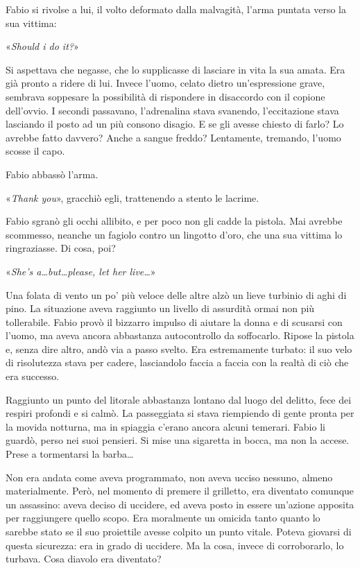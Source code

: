 Fabio si rivolse a lui, il volto deformato dalla malvagità, l'arma puntata verso la sua vittima:

«\textit{Should i do it?}»

Si aspettava che negasse, che lo supplicasse di lasciare in vita la sua amata. Era già pronto a ridere di lui. Invece l'uomo, celato dietro un'espressione grave, sembrava soppesare la possibilità di rispondere in disaccordo con il copione dell'ovvio. I secondi passavano, l'adrenalina stava svanendo, l'eccitazione stava lasciando il posto ad un più consono disagio. E se gli avesse chiesto di farlo? Lo avrebbe fatto davvero? Anche a sangue freddo? Lentamente, tremando, l'uomo scosse il capo.

Fabio abbassò l'arma.

«\textit{Thank you}», gracchiò egli, trattenendo a stento le lacrime.

Fabio sgranò gli occhi allibito, e per poco non gli cadde la pistola. Mai avrebbe scommesso, neanche un fagiolo contro un lingotto d'oro, che una sua vittima lo ringraziasse. Di cosa, poi?

«\textit{She's a\ldots but\ldots please, let her live\ldots}»

Una folata di vento un po' più veloce delle altre alzò un lieve turbinio di aghi di pino. La situazione aveva raggiunto un livello di assurdità ormai non più tollerabile. Fabio provò il bizzarro impulso di aiutare la donna e di scusarsi con l'uomo, ma aveva ancora abbastanza autocontrollo da soffocarlo. Ripose la pistola e, senza dire altro, andò via a passo svelto. Era estremamente turbato: il suo velo di risolutezza stava per cadere, lasciandolo faccia a faccia con la realtà di ciò che era successo.

Raggiunto un punto del litorale abbastanza lontano dal luogo del delitto, fece dei respiri profondi e si calmò. La passeggiata si stava riempiendo di gente pronta per la movida notturna, ma in spiaggia c'erano ancora alcuni temerari. Fabio li guardò, perso nei suoi pensieri. Si mise una sigaretta in bocca, ma non la accese. Prese a tormentarsi la barba\ldots

Non era andata come aveva programmato, non aveva ucciso nessuno, almeno materialmente. Però, nel momento di premere il grilletto, era diventato comunque un assassino: aveva deciso di uccidere, ed aveva posto in essere un'azione apposita per raggiungere quello scopo. Era moralmente un omicida tanto quanto lo sarebbe stato se il suo proiettile avesse colpito un punto vitale. Poteva giovarsi di questa sicurezza: era in grado di uccidere. Ma la cosa, invece di corroborarlo, lo turbava. Cosa diavolo era diventato?

